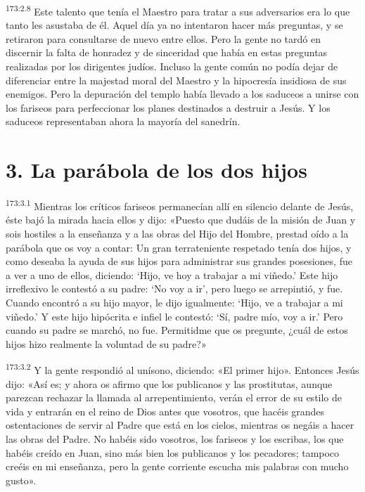 \par 
\textsuperscript{173:2.8} Este talento que tenía el Maestro para tratar a sus adversarios era lo que tanto les asustaba de él. Aquel día ya no intentaron hacer más preguntas, y se retiraron para consultarse de nuevo entre ellos. Pero la gente no tardó en discernir la falta de honradez y de sinceridad que había en estas preguntas realizadas por los dirigentes judíos. Incluso la gente común no podía dejar de diferenciar entre la majestad moral del Maestro y la hipocresía insidiosa de sus enemigos. Pero la depuración del templo había llevado a los saduceos a unirse con los fariseos para perfeccionar los planes destinados a destruir a Jesús. Y los saduceos representaban ahora la mayoría del sanedrín.

\section*{3. La parábola de los dos hijos}
\par 
\textsuperscript{173:3.1} Mientras los críticos fariseos permanecían allí en silencio delante de Jesús, éste bajó la mirada hacia ellos y dijo: «Puesto que dudáis de la misión de Juan y sois hostiles a la enseñanza y a las obras del Hijo del Hombre, prestad oído a la parábola que os voy a contar: Un gran terrateniente respetado tenía dos hijos, y como deseaba la ayuda de sus hijos para administrar sus grandes posesiones, fue a ver a uno de ellos, diciendo: `Hijo, ve hoy a trabajar a mi viñedo.' Este hijo irreflexivo le contestó a su padre: `No voy a ir', pero luego se arrepintió, y fue. Cuando encontró a su hijo mayor, le dijo igualmente: `Hijo, ve a trabajar a mi viñedo.' Y este hijo hipócrita e infiel le contestó: `Sí, padre mío, voy a ir.' Pero cuando su padre se marchó, no fue. Permitidme que os pregunte, ¿cuál de estos hijos hizo realmente la voluntad de su padre?»

\par 
\textsuperscript{173:3.2} Y la gente respondió al unísono, diciendo: «El primer hijo». Entonces Jesús dijo: «Así es; y ahora os afirmo que los publicanos y las prostitutas, aunque parezcan rechazar la llamada al arrepentimiento, verán el error de su estilo de vida y entrarán en el reino de Dios antes que vosotros, que hacéis grandes ostentaciones de servir al Padre que está en los cielos, mientras os negáis a hacer las obras del Padre. No habéis sido vosotros, los fariseos y los escribas, los que habéis creído en Juan, sino más bien los publicanos y los pecadores; tampoco creéis en mi enseñanza, pero la gente corriente escucha mis palabras con mucho gusto».

